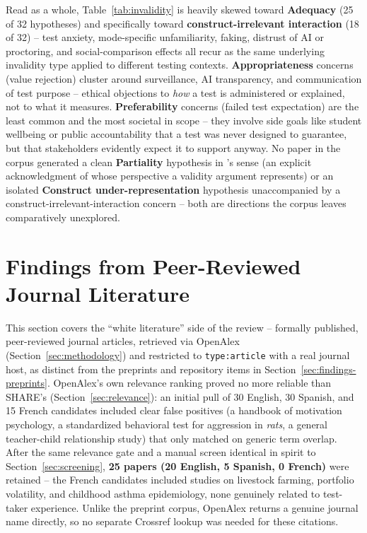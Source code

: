 \documentclass[11pt]{article}
\begin{document}
Read as a whole, Table~\ref{tab:invalidity} is heavily skewed toward \textbf{Adequacy} (25 of 32 hypotheses) and specifically toward \textbf{construct-irrelevant interaction} (18 of 32) -- test anxiety, mode-specific unfamiliarity, faking, distrust of AI or proctoring, and social-comparison effects all recur as the same underlying invalidity type applied to different testing contexts. \textbf{Appropriateness} concerns (value rejection) cluster around surveillance, AI transparency, and communication of test purpose -- ethical objections to \emph{how} a test is administered or explained, not to what it measures. \textbf{Preferability} concerns (failed test expectation) are the least common and the most societal in scope -- they involve side goals like student wellbeing or public accountability that a test was never designed to guarantee, but that stakeholders evidently expect it to support anyway. No paper in the corpus generated a clean \textbf{Partiality} hypothesis in \citeauthor{araneda2023dissertation}'s sense (an explicit acknowledgment of whose perspective a validity argument represents) or an isolated \textbf{Construct under-representation} hypothesis unaccompanied by a construct-irrelevant-interaction concern -- both are directions the corpus leaves comparatively unexplored.

\section{Findings from Peer-Reviewed Journal Literature}
\label{sec:findings-openalex}

This section covers the ``white literature'' side of the review -- formally published, peer-reviewed journal articles, retrieved via OpenAlex (Section~\ref{sec:methodology}) and restricted to \texttt{type:article} with a real journal host, as distinct from the preprints and repository items in Section~\ref{sec:findings-preprints}. OpenAlex's own relevance ranking proved no more reliable than SHARE's (Section~\ref{sec:relevance}): an initial pull of 30 English, 30 Spanish, and 15 French candidates included clear false positives (a handbook of motivation psychology, a standardized behavioral test for aggression in \emph{rats}, a general teacher-child relationship study) that only matched on generic term overlap. After the same relevance gate and a manual screen identical in spirit to Section~\ref{sec:screening}, \textbf{25 papers (20 English, 5 Spanish, 0 French)} were retained -- the French candidates included studies on livestock farming, portfolio volatility, and childhood asthma epidemiology, none genuinely related to test-taker experience. Unlike the preprint corpus, OpenAlex returns a genuine journal name directly, so no separate Crossref lookup was needed for these citations.
\end{document}
